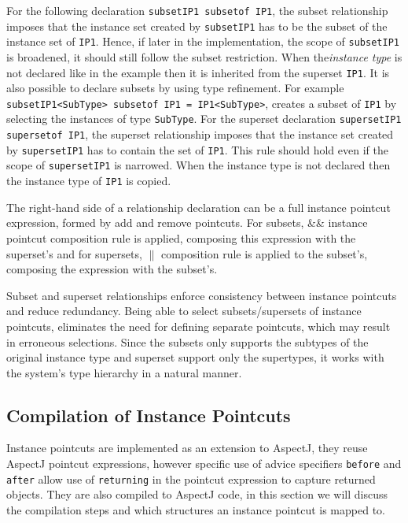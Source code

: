 \documentclass{llncs}
\begin{document}
For the following declaration \lstinline!subsetIP1 subsetof IP1!, the subset relationship imposes that the instance set created by \texttt{subsetIP1} has to be the subset of the instance set of \texttt{IP1}. Hence, if later in the implementation, the scope of \texttt{subsetIP1} is broadened, it should still follow the subset restriction. When the\emph{instance type} is not declared like in the example then it is inherited from the superset \texttt{IP1}. It is also possible to declare subsets by using type refinement. For example \lstinline!subsetIP1<SubType> subsetof IP1 = IP1<SubType>!, creates a subset of \texttt{IP1} by selecting the instances of type \texttt{SubType}. 
For the superset declaration \lstinline!supersetIP1 supersetof IP1!, the superset relationship imposes that the instance set created by \texttt{supersetIP1} has to contain the set of \texttt{IP1}. This rule should hold even if the scope of \texttt{supersetIP1} is narrowed. When the instance type is not declared then the instance type of \texttt{IP1} is copied. 

The right-hand side of a relationship declaration can be a full instance pointcut expression, formed by add and remove pointcuts. For subsets, \&\& instance pointcut composition rule is applied, composing this expression with the superset's and for supersets, $\|$ composition rule is applied to the subset's, composing the expression with the subset's. 

Subset and superset relationships enforce consistency between instance pointcuts and reduce redundancy. Being able to select subsets/supersets of instance pointcuts, eliminates the need for defining separate pointcuts, which may result in erroneous selections. Since the subsets only supports the subtypes of the original instance type and superset support only the supertypes, it works with the system's type hierarchy in a natural manner. 




\subsection{Compilation of Instance Pointcuts}

Instance pointcuts are implemented as an extension to AspectJ, they reuse AspectJ pointcut expressions, however specific use of advice specifiers \texttt{before} and \texttt{after} allow use of \texttt{returning} in the pointcut expression to capture returned objects. They are also compiled to AspectJ code, in this section we will discuss the compilation steps and which structures an instance pointcut is mapped to.
\end{document}

